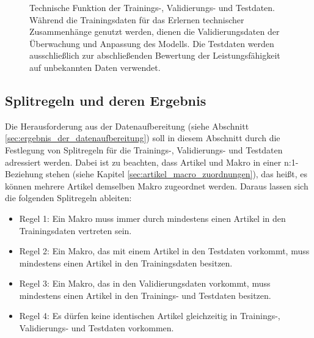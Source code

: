 \begin{figure}[H]
        \caption{Technische Funktion der Trainings-, Validierungs- und Testdaten. Während die Trainingsdaten für das Erlernen technischer Zusammenhänge genutzt werden, dienen die Validierungsdaten der Überwachung und Anpassung des Modells. Die Testdaten werden ausschließlich zur abschließenden Bewertung der Leistungsfähigkeit auf unbekannten Daten verwendet.} 
        \label{fig:datensplit_funktion} 
        \end{figure}


\subsection{Splitregeln und deren Ergebnis}
\label{sec:splitregeln} 

Die Herausforderung aus der Datenaufbereitung (siehe Abschnitt \ref{sec:ergebnis_der_datenaufbereitung}) soll in diesem Abschnitt durch die Festlegung von Splitregeln für die Trainings-, Validierungs- und Testdaten adressiert werden.
Dabei ist zu beachten, dass Artikel und Makro in einer n:1-Beziehung stehen (siehe Kapitel \ref{sec:artikel_macro_zuordnungen}), das heißt, es können mehrere Artikel demselben Makro zugeordnet werden. Daraus lassen sich die folgenden Splitregeln ableiten: 

\begin{itemize} 
    \item Regel 1: Ein Makro muss immer durch mindestens einen Artikel in den Trainingsdaten vertreten sein. 
    \item Regel 2: Ein Makro, das mit einem Artikel in den Testdaten vorkommt, muss mindestens einen Artikel in den Trainingsdaten besitzen. 
    \item Regel 3: Ein Makro, das in den Validierungsdaten vorkommt, muss mindestens einen Artikel in den Trainings- und Testdaten besitzen. 
    \item Regel 4: Es dürfen keine identischen Artikel gleichzeitig in Trainings-, Validierungs- und Testdaten vorkommen. 
\end{itemize} 

